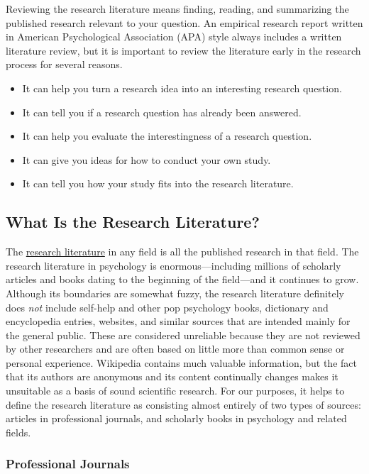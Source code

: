 \documentclass[
]{krantz}
\providecommand{\tightlist}{%
  \setlength{\itemsep}{0pt}\setlength{\parskip}{0pt}}
\begin{document}
Reviewing the research literature means finding, reading, and summarizing the published research relevant to your question. An empirical research report written in American Psychological Association (APA) style always includes a written literature review, but it is important to review the literature early in the research process for several reasons.

\begin{itemize}
\tightlist
\item
  It can help you turn a research idea into an interesting research question.
\item
  It can tell you if a research question has already been answered.
\item
  It can help you evaluate the interestingness of a research question.
\item
  It can give you ideas for how to conduct your own study.
\item
  It can tell you how your study fits into the research literature.
\end{itemize}

\subsection*{What Is the Research Literature?}\label{what-is-the-research-literature}


The \hyperref[research-literature]{research literature} in any field is all the published research in that field. The research literature in psychology is enormous---including millions of scholarly articles and books dating to the beginning of the field---and it continues to grow. Although its boundaries are somewhat fuzzy, the research literature definitely does \emph{not} include self-help and other pop psychology books, dictionary and encyclopedia entries, websites, and similar sources that are intended mainly for the general public. These are considered unreliable because they are not reviewed by other researchers and are often based on little more than common sense or personal experience. Wikipedia contains much valuable information, but the fact that its authors are anonymous and its content continually changes makes it unsuitable as a basis of sound scientific research. For our purposes, it helps to define the research literature as consisting almost entirely of two types of sources: articles in professional journals, and scholarly books in psychology and related fields.

\subsubsection*{Professional Journals}\label{professional-journals}
\end{document}

